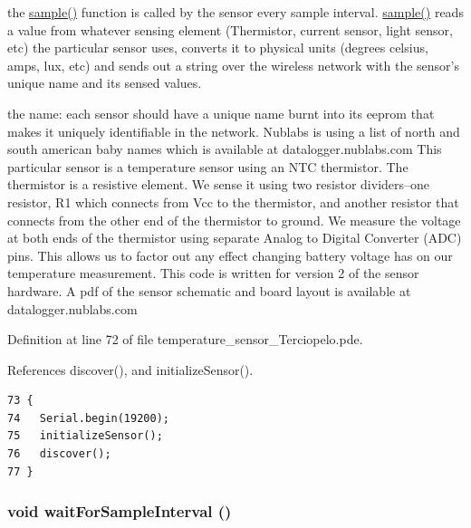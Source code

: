 the \hyperlink{temperature__sensor___terciopelo_8pde_50a2ce599e896bfb535e70a42003ed23}{sample()} function is called by the sensor every sample interval. \hyperlink{temperature__sensor___terciopelo_8pde_50a2ce599e896bfb535e70a42003ed23}{sample()} reads a value from whatever sensing element (Thermistor, current sensor, light sensor, etc) the particular sensor uses, converts it to physical units (degrees celsius, amps, lux, etc) and sends out a string over the wireless network with the sensor's unique name and its sensed values.

the name: each sensor should have a unique name burnt into its eeprom that makes it uniquely identifiable in the network. Nublabs is using a list of north and south american baby names which is available at datalogger.nublabs.com This particular sensor is a temperature sensor using an NTC thermistor. The thermistor is a resistive element. We sense it using two resistor dividers--one resistor, R1 which connects from Vcc to the thermistor, and another resistor that connects from the other end of the thermistor to ground. We measure the voltage at both ends of the thermistor using separate Analog to Digital Converter (ADC) pins. This allows us to factor out any effect changing battery voltage has on our temperature measurement. This code is written for version 2 of the sensor hardware. A pdf of the sensor schematic and board layout is available at datalogger.nublabs.com 

Definition at line 72 of file temperature\_\-sensor\_\-Terciopelo.pde.

References discover(), and initializeSensor().

\begin{Code}\begin{verbatim}73 {
74   Serial.begin(19200);
75   initializeSensor();
76   discover();
77 }
\end{verbatim}
\end{Code}


\hypertarget{temperature__sensor___terciopelo_8pde_b4dbd8380e5d93ead613cf38e6083b7f}{
\subsubsection[{waitForSampleInterval}]{\setlength{\rightskip}{0pt plus 5cm}void waitForSampleInterval ()}}
\label{temperature__sensor___terciopelo_8pde_b4dbd8380e5d93ead613cf38e6083b7f}


